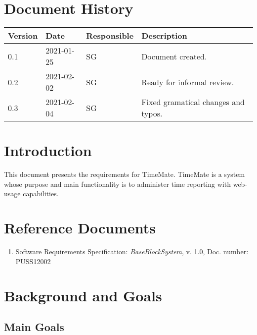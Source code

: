 \documentclass{article}
\date {#1}
\title {
    \documentNumber {01}    
    
    \documentVersion {0.4}
    
    \documentTitle {Software Requirements Specification}
    \documentGroup {2}
    
    \documentResponsible {System Group}
    \documentAuthors {System Group, Development Group}
    
    \documentDate {2021-02-09}
}
\begin{document}
\maketitle
\thispagestyle{empty}

\newpage

\tableofcontents

\newpage

\section{Document History}
\begin{tabular}{ l | l | l | l }
    Version & Date & Responsible & Description \\
    \hline
    0.1 & 2021-01-25 & SG & Document created. \\
    0.2 & 2021-02-02 & SG & Ready for informal review. \\
    0.3 & 2021-02-04 & SG & Fixed gramatical changes and typos. \\
\end{tabular}

\section{Introduction}

This document presents the requirements for TimeMate. TimeMate is a system whose purpose and main functionality is to administer time reporting with web-usage capabilities. 


\section{Reference Documents}

\begin{enumerate}
  \item Software Requirements Specification: \emph{BaseBlockSystem}, v. 1.0, Doc. number: PUSS12002
  
\end{enumerate}

\section{Background and Goals}
\subsection{Main Goals}
\end{document}
